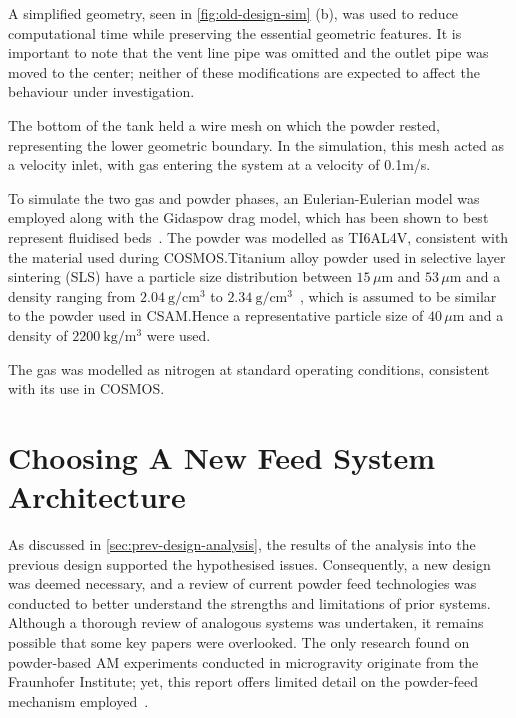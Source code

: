 A simplified geometry, seen in \autoref{fig:old-design-sim} (b), was used to reduce computational time while preserving the essential geometric features. It is important to note that the vent line pipe was omitted and the outlet pipe was moved to the center; neither of these modifications are expected to affect the behaviour under investigation. 

The bottom of the tank held a wire mesh on which the powder rested, representing the lower geometric boundary. In the simulation, this mesh acted as a velocity inlet, with gas entering the system at a velocity of 0.1m/s. 

To simulate the two gas and powder phases, an Eulerian-Eulerian model was employed along with the Gidaspow drag model, which has been shown to best represent fluidised beds~\cite{C6RA28615A}. The powder was modelled as TI6AL4V, consistent with the material used during COSMOS.\@ Titanium alloy powder used in selective layer sintering (SLS) have a particle size distribution between $15\,\mu\mathrm{m}$ and $53\,\mu\mathrm{m}$ and a density ranging from $2.04\ \mathrm{g/cm^3}$ to $2.34\ \mathrm{g/cm^3}$~\cite{ma17040952}, which is assumed to be similar to the powder used in CSAM.\@ Hence a representative particle size of $40\,\mu\mathrm{m}$ and a density of $2200\ \mathrm{kg/m^3}$ were used. 

The gas was modelled as nitrogen at standard operating conditions, consistent with its use in COSMOS.\@

\section{Choosing A New Feed System Architecture}\label{sec:system_architecture}
As discussed in \autoref{sec:prev-design-analysis}, the results of the analysis into the previous design supported the hypothesised issues. Consequently, a new design was deemed necessary, and a review of current powder feed technologies was conducted to better understand the strengths and limitations of prior systems. Although a thorough review of analogous systems was undertaken, it remains possible that some key papers were overlooked. The only research found on powder-based AM experiments conducted in microgravity originate from the Fraunhofer Institute; yet, this report offers limited detail on the powder-feed mechanism employed~\cite{OVERMEYER2025}. 

